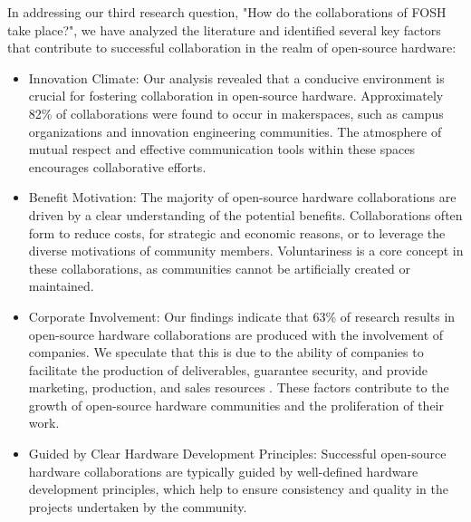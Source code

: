 \documentclass[final-report.tex]{subfiles}
\begin{document}
In addressing our third research question, "How do the collaborations of FOSH take place?", we have analyzed the literature and identified several key factors that contribute to successful collaboration in the realm of open-source hardware:
\begin{itemize}
    \item Innovation Climate: Our analysis revealed that a conducive environment is crucial for fostering collaboration in open-source hardware. Approximately 82\% of collaborations were found to occur in makerspaces, such as campus organizations and innovation engineering communities. The atmosphere of mutual respect and effective communication tools within these spaces encourages collaborative efforts.
    \item Benefit Motivation: The majority of open-source hardware collaborations are driven by a clear understanding of the potential benefits. Collaborations often form to reduce costs, for strategic and economic reasons, or to leverage the diverse motivations of community members. Voluntariness is a core concept in these collaborations, as communities cannot be artificially created or maintained.
    \item Corporate Involvement: Our findings indicate that 63\% of research results in open-source hardware collaborations are produced with the involvement of companies. We speculate that this is due to the ability of companies to facilitate the production of deliverables, guarantee security, and provide marketing, production, and sales resources \cite{peters2022success}. These factors contribute to the growth of open-source hardware communities and the proliferation of their work.
    \item Guided by Clear Hardware Development Principles: Successful open-source hardware collaborations are typically guided by well-defined hardware development principles, which help to ensure consistency and quality in the projects undertaken by the community.
\end{itemize}
\end{document}
